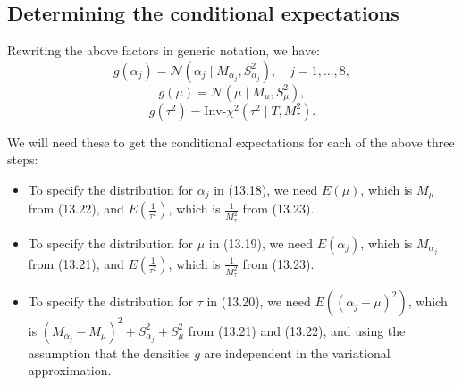 \documentclass{article}
\begin{document}
\subsection*{Determining the conditional expectations}
Rewriting the above factors in generic notation, we have:
\[
g(\alpha_j) = \mathcal{N}(\alpha_j \mid M_{\alpha_j}, S^2_{\alpha_j}), \quad j = 1, \ldots, 8, \tag{13.21}
\]
\[
g(\mu) = \mathcal{N}(\mu \mid M_\mu, S^2_\mu), \tag{13.22}
\]
\[
g(\tau^2) = \text{Inv-}\chi^2(\tau^2 \mid T, M_\tau^2). \tag{13.23}
\]

We will need these to get the conditional expectations for each of the above three steps:
\begin{itemize}
    \item To specify the distribution for $\alpha_j$ in (13.18), we need $E(\mu)$, which is $M_\mu$ 
    from (13.22), and $E\left(\frac{1}{\tau^2}\right)$, which is $\frac{1}{M_\tau^2}$ from (13.23).
    \item To specify the distribution for $\mu$ in (13.19), we need $E(\alpha_j)$, which is $M_{\alpha_j}$ 
    from (13.21), and $E\left(\frac{1}{\tau^2}\right)$, which is $\frac{1}{M_\tau^2}$ from (13.23).
    \item To specify the distribution for $\tau$ in (13.20), we need $E\left((\alpha_j - \mu)^2\right)$, 
    which is $(M_{\alpha_j} - M_\mu)^2 + S_{\alpha_j}^2 + S_\mu^2$ from (13.21) and (13.22), and using the 
    assumption that the densities $g$ are independent in the variational approximation.
\end{itemize}
\end{document}
